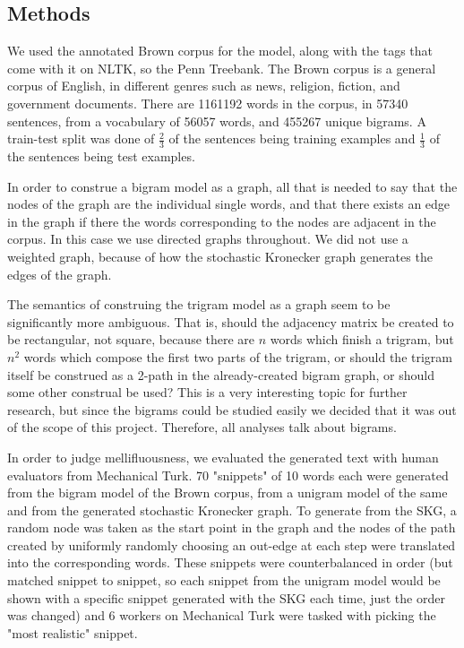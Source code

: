 \documentclass[12pt]{article}
\begin{document}
\subsection{Methods}
We used the annotated Brown corpus for the model, along with the tags that come with it on NLTK, so the Penn Treebank. The Brown corpus is a general corpus of English, in different genres such as news, religion, fiction, and government documents. There are 1161192 words in the corpus, in 57340 sentences, from a vocabulary of 56057 words, and 455267 unique bigrams. A train-test split was done of $\frac{2}{3}$ of the sentences being training examples and $\frac{1}{3}$ of the sentences being test examples. %

In order to construe a bigram model as a graph, all that is needed to say that the nodes of the graph are the individual single words, and that there exists an edge in the graph if there the words corresponding to the nodes are adjacent in the corpus. In this case we use directed graphs throughout. We did not use a weighted graph, because of how the stochastic Kronecker graph generates the edges of the graph. %

The semantics of construing the trigram model as a graph seem to be significantly more ambiguous. That is, should the adjacency matrix be created to be rectangular, not square, because there are $n$ words which finish a trigram, but $n^2$ words which compose the first two parts of the trigram, or should the trigram itself be construed as a 2-path in the already-created bigram graph, or should some other construal be used? This is a very interesting topic for further research, but since the bigrams could be studied easily we decided that it was out of the scope of this project. Therefore, all analyses talk about bigrams.

In order to judge mellifluousness, we evaluated the generated text with human evaluators from Mechanical Turk. 70 "snippets" of 10 words each were generated from the bigram model of the Brown corpus, from a unigram model of the same and from the generated stochastic Kronecker graph. To generate from the SKG, a random node was taken as the start point in the graph and the nodes of the path created by uniformly randomly choosing an out-edge at each step were translated into the corresponding words. These snippets were counterbalanced in order (but matched snippet to snippet, so each snippet from the unigram model would be shown with a specific snippet generated with the SKG each time, just the order was changed) and 6 workers on Mechanical Turk were tasked with picking the "most realistic" snippet.
\end{document}
